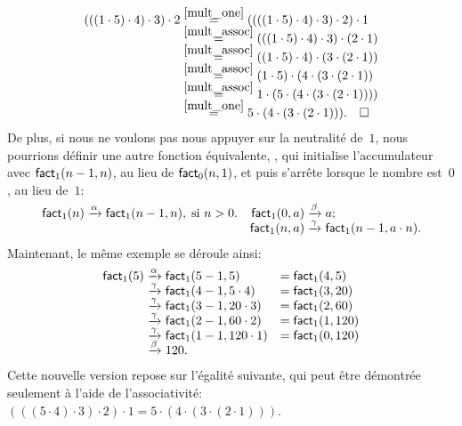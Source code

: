 \begin{align*}
  (((1 \cdot 5) \cdot 4) \cdot 3) \cdot 2
  &\mathrel{\stackrel{\smash{\smash{\ref{mult_one}}}}{=}} ((((1 \cdot 5) \cdot 4) \cdot 3) \cdot
  2) \cdot 1\\
  &\mathrel{\stackrel{\smash{\smash{\ref{mult_assoc}}}}{=}} (((1 \cdot 5) \cdot 4) \cdot 3)
  \cdot (2 \cdot 1)\\ 
  &\mathrel{\stackrel{\smash{\smash{\ref{mult_assoc}}}}{=}} ((1 \cdot 5) \cdot 4) \cdot (3 \cdot (2
    \cdot 1))\\
  &\mathrel{\stackrel{\smash{\smash{\ref{mult_assoc}}}}{=}} (1 \cdot 5) \cdot (4 \cdot (3 \cdot
  (2 \cdot 1))\\
  &\mathrel{\stackrel{\smash{\smash{\ref{mult_assoc}}}}{=}} 1 \cdot (5 \cdot (4 \cdot (3 \cdot
  (2 \cdot 1))))\\
  &\mathrel{\stackrel{\smash{\smash{\ref{mult_one}}}}{=}} 5 \cdot (4 \cdot (3 \cdot (2 \cdot
  1))).\quad \Box
\end{align*}
De plus, si nous ne voulons pas nous appuyer sur la neutralité
de~\(1\), nous pourrions définir une autre fonction équivalente,
, qui initialise l'accumulateur avec
\(\textsf{fact}_1(n-1,n)\), au lieu de \(\textsf{fact}_0(n,1)\), et puis
s'arrête lorsque le nombre est~\(0\), au lieu de~\(1\):
\begin{equation*}
\begin{array}{@{}r@{\;}l@{\;}lr@{\;}l@{\;}l@{}}
\fun{fact}_1(n) & \xrightarrow{\smash[t]{\alpha}} &
\fun{fact}_1(n-1,n),\;\text{si \(n > 0\)}.
& \fun{fact}_1(0,a) & \xrightarrow{\smash[t]{\beta}} & a;\\
&&& \fun{fact}_1(n,a) & \xrightarrow{\smash[t]{\gamma}} & 
\fun{fact}_1(n-1,a \cdot n).
\end{array}
\end{equation*}
Maintenant, le même exemple se déroule ainsi:
\begin{equation*}
\begin{array}{r@{\;}c@{\;}lc@{\;}l}
\fun{fact}_1(5)
& \xrightarrow{\smash[t]{\alpha}} & \fun{fact}_1(5-1,5)
& = & \fun{fact}_1(4,5)\\
& \xrightarrow{\smash[t]{\gamma}} & \fun{fact}_1(4-1,5 \cdot 4)
& = & \fun{fact}_1(3,20)\\
& \xrightarrow{\smash[t]{\gamma}} & \fun{fact}_1(3-1,20 \cdot 3)
& = & \fun{fact}_1(2,60)\\
& \xrightarrow{\smash[t]{\gamma}} & \fun{fact}_1(2-1,60 \cdot 2)
& = & \fun{fact}_1(1,120)\\
& \xrightarrow{\smash[t]{\gamma}} & \fun{fact}_1(1-1,120 \cdot 1)
& = & \fun{fact}_1(0,120)\\
& \xrightarrow{\smash[t]{\beta}} & 120.
\end{array}
\end{equation*}
Cette nouvelle version repose sur l'égalité suivante, qui peut être
démontrée seulement à l'aide de l'associativité: \((((5 \cdot 4) \cdot
3) \cdot 2) \cdot 1 = 5 \cdot (4 \cdot (3 \cdot (2 \cdot 1)))\).

